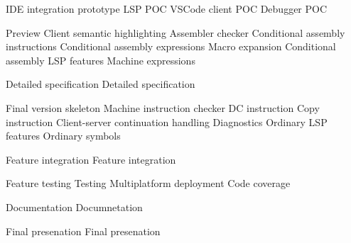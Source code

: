 	\itemm IDE integration prototype 
		\bwp
			\itemwp LSP POC 
			\itemwp VSCode client POC 
			\itemwp Debugger POC 
		\eenum
	
	\itemm \label{milestone_preview} Preview 
		\bwp
			\itemwp Client semantic highlighting 
			\itemwp Assembler checker 
			\itemwp Conditional assembly instructions 
			\itemwp Conditional assembly expressions 
			\itemwp Macro expansion 
			\itemwp Conditional assembly LSP features 
			\itemwp Machine expressions 
		\eenum
	
	\itemm Detailed specification 
		\bwp
			\itemwp Detailed specification 
		\eenum
	
	\itemm Final version skeleton 
		\bwp
			\itemwp Machine instruction checker 
			\itemwp DC instruction 
			\itemwp Copy instruction 
			\itemwp Client-server continuation handling 
			\itemwp Diagnostics 
			\itemwp Ordinary LSP features 
			\itemwp Ordinary symbols 
		\eenum
	
	\itemm Feature integration 
		\bwp
			\itemwp Feature integration 
		\eenum
	
	\itemm Feature testing 
		\bwp
			\itemwp Testing 
			\itemwp Multiplatform deployment 
			\itemwp Code coverage 
		\eenum
	
	\itemm Documentation 
		\bwp
			\itemwp Documnetation 
		\eenum
	
	\itemm Final presenation 
		\bwp
			\itemwp Final presenation 
		\eenum
\eenum



